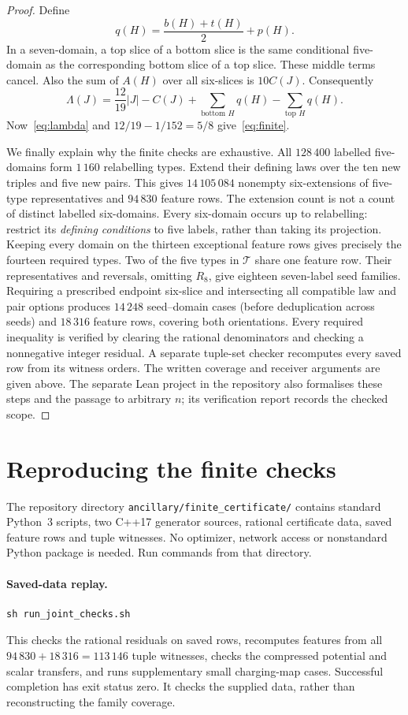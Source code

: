 \documentclass[11pt,letterpaper]{article}
\theoremstyle{remark}\newtheorem{remark}[theorem]{Remark}
\begin{document}
\begin{proof}
Define
\[
 q(H)=\frac{b(H)+t(H)}2+p(H).
\]
In a seven-domain, a top slice of a bottom slice is the same conditional
five-domain as the corresponding bottom slice of a top slice.
These middle terms cancel. Also the sum of $A(H)$ over all six-slices
is $10C(J)$. Consequently
\[
 \Lambda(J)=\frac{12}{19}|J|-C(J)
       +\sum_{\text{bottom }H}q(H)-\sum_{\text{top }H}q(H).
\]
Now~\eqref{eq:lambda} and $12/19-1/152=5/8$ give~\eqref{eq:finite}.

We finally explain why the finite checks are exhaustive.
All $128\,400$ labelled five-domains form $1\,160$ relabelling types.
Extend their defining laws over the ten new triples and five new pairs.
This gives $14\,105\,084$ nonempty six-extensions of five-type
representatives and $94\,830$ feature rows. The extension count is not a
count of distinct labelled six-domains.
Every six-domain occurs up to relabelling: restrict its \emph{defining
conditions} to five labels, rather than taking its projection.
Keeping every domain on the thirteen exceptional feature rows gives precisely the
fourteen required types. Two of the five types in $\mathcal T$ share one feature row.
Their representatives and reversals, omitting
$R_8$, give eighteen seven-label seed families. Requiring a prescribed
endpoint six-slice and intersecting all compatible law and pair options
produces $14\,248$ seed--domain cases (before deduplication across seeds)
and $18\,316$ feature rows, covering both
orientations. Every required inequality is verified by clearing the rational
denominators and checking a nonnegative integer residual. A separate
tuple-set checker recomputes every saved row from its witness orders.
The written coverage and receiver arguments are given above. The separate
Lean project in the repository also formalises these steps and the passage
to arbitrary $n$; its verification report records the checked scope.
\end{proof}


\section{Reproducing the finite checks}
The repository directory \texttt{ancillary/finite\_certificate/} contains
standard Python~3
scripts, two C++17 generator sources, rational certificate data, saved
feature rows and tuple witnesses. No optimizer, network access or
nonstandard Python package is needed. Run commands from that directory.

\paragraph{Saved-data replay.}
\begin{verbatim}
sh run_joint_checks.sh
\end{verbatim}
This checks the rational residuals on saved rows, recomputes features
from all $94\,830+18\,316=113\,146$ tuple witnesses, checks the
compressed potential and scalar transfers, and runs supplementary small
charging-map cases. Successful completion has exit status zero. It
checks the supplied data, rather than reconstructing the family coverage.
\end{document}
